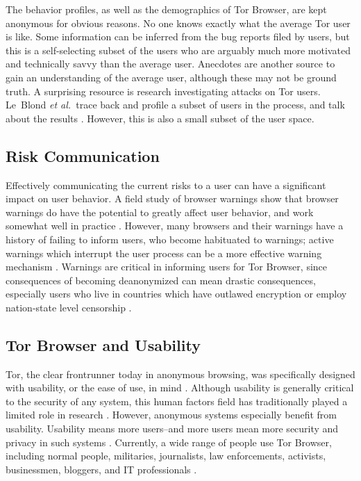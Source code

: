 \documentclass{acm_proc_article-sp}
\def\etal{{\it et al.~}}
\begin{document}
The behavior profiles, as well as the demographics of Tor Browser, are kept anonymous for obvious reasons. No one knows exactly what the average Tor user is like. Some information can be inferred from the bug reports filed by users, but this is a self-selecting subset of the users who are arguably much more motivated and technically savvy than the average user. Anecdotes are another source to gain an understanding of the average user, although these may not be ground truth. A surprising resource is research investigating attacks on Tor users. Le~Blond \etal trace back and profile a subset of users in the process, and talk about the results \cite{blond2011one}. However, this is also a small subset of the user space.  

\subsection{Risk Communication}
Effectively communicating the current risks to a user can have a significant impact on user behavior. A field study of browser warnings show that browser warnings do have the potential to greatly affect user behavior, and work somewhat well in practice \cite{akhawe2013alice}. However, many browsers and their warnings have a history of failing to inform users, who become habituated to warnings; active warnings which interrupt the user process can be a more effective warning mechanism \cite{egelman2008you}. Warnings are critical in informing users for Tor Browser, since consequences of becoming deanonymized can mean drastic consequences, especially users who live in countries which have outlawed encryption or employ nation-state level censorship \cite{crypto_wikipedia_2015,china_wikipedia_2015}. 

\subsection{Tor Browser and Usability}

Tor, the clear frontrunner today in anonymous browsing, was specifically designed with usability, or the ease of use, in mind \cite{tor_wikipedia_2015, dingledine2004tor}. Although usability is generally critical to the security of any system, this human factors field has traditionally played a limited role in research \cite{cranor2005security}. However, anonymous systems especially benefit from usability. Usability means more users--and more users mean more security and privacy in such systems \cite{dingledine2006anonymity}. Currently, a wide range of people use Tor Browser, including normal people, militaries, journalists, law enforcements, activists, businessmen, bloggers, and IT professionals \cite{torproject_2015}. 
\end{document}
